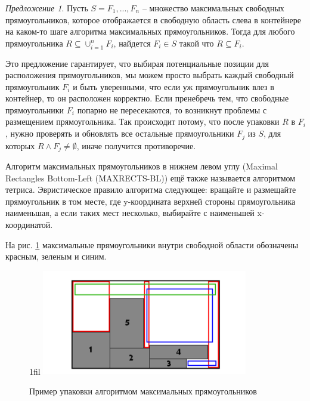 \documentclass[a4paper,12pt]{report}
\makeatletter
\theoremstyle{remark}
\newtheorem*{lemma}{Предложение}
\newcommand*{\centerfloat}{%
  \parindent \z@
  \leftskip \z@ \@plus 1fil \@minus \textwidth
  \rightskip\leftskip
  \parfillskip \z@skip}
\makeatother
\begin{document}
\vspace{15pt}
\begin{lemma}\citep{Jylanki}
Пусть $S = {F_1, ... , F_n}$ – множество максимальных свободных прямоугольников, которое отображается в свободную область слева в контейнере на каком-то шаге алгоритма максимальных прямоугольников. Тогда для любого прямоугольника $R \subseteq \cup^{n}_{i=1}F_i$, найдется $F_i \in S$ такой что $R \subseteq F_i$.

Это предложение гарантирует, что выбирая потенциальные позиции для расположения прямоугольников, мы можем просто выбрать каждый свободный прямоугольник $F_i$ и быть уверенными, что если уж прямоугольник влез в контейнер, то он расположен корректно.
Если пренебречь тем, что свободные прямоугольники $F_i$ попарно не пересекаются, то возникнут проблемы с размещением прямоугольника. Так происходит потому, что после упаковки $R$ в $F_i$, нужно проверять и обновлять все остальные прямоугольники $F_j$ из $S$, для которых $R \wedge F_j \neq \emptyset$, иначе получится противоречие. 
\end{lemma}
\vspace{15pt}

Алгоритм максимальных прямоугольников в нижнем левом углу (Maximal Rectangles Bottom-Left (MAXRECTS-BL)) ещё также называется алгоритмом тетриса. Эвристическое правило алгоритма следующее: вращайте и размещайте прямоугольник в том месте, где y-координата верхней стороны прямоугольника наименьшая, а если таких мест несколько, выбирайте с наименьшей x-координатой.

На рис. \ref{fig:maxrects} максимальные прямоугольники внутри свободной области обозначены красным, зеленым и синим. 

\begin{figure}
    \centerfloat
    \includegraphics[width=0.8\textwidth]{packing/4.png}
    \caption{Пример упаковки алгоритмом максимальных прямоугольников}
    \label{fig:maxrects}
\end{figure}
\end{document}
